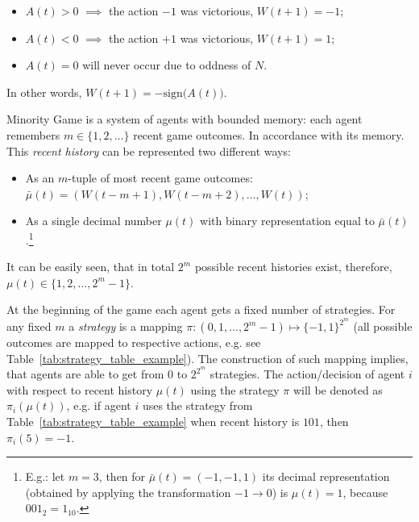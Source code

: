 \documentclass[11pt,american,czech]{article}
\begin{document}
\begin{itemize}
\item $A(t)>0$ $\implies$ the action $-1$ was victorious, $W(t+1)=-1$;
\item $A(t)<0$ $\implies$ the action $+1$ was victorious, $W(t+1)=1$;
\item $A(t)=0$ will never occur due to oddness of $N$.
\end{itemize} 

\noindent
In other words, $W(t+1) = -\text{sign}\big(A(t)\big)$.

\medskip

Minority  Game is a system of agents with bounded memory: each agent remembers $m\in\{1,2,\dots\}$ recent game outcomes. In accordance with its memory. This \textit{recent history} can be represented two different ways:

\begin{itemize}
	\item As an $m$-tuple of most recent game outcomes: $\bar{\mu}(t)=(W(t-m+1),W(t-m+2),\dots,W(t))$;
	\item As a single decimal number $\mu(t)$ with binary representation equal to $\bar{\mu}(t)$.\footnote{E.g.: let $m=3$, then for $\bar{\mu}(t)=(-1,-1,1)$ its decimal representation (obtained by applying the transformation $-1\rightarrow 0$) is $\mu(t)=1$, because $001_{2}=1_{10}$.}
\end{itemize} 

\noindent
It can be easily seen, that in total $2^{m}$ possible recent histories exist, therefore, $\mu(t)\in\{1,2,\dots,2^{m}-1\}$.

\medskip

At the beginning of the game each agent gets a fixed number of strategies. For any fixed $m$ a \textit{strategy} is a mapping $\pi:(0,1,\dots,2^m-1)\mapsto\{-1,1\}^{2^{m}}$ (all possible outcomes are mapped to respective actions, e.g. see Table~\ref{tab:strategy_table_example}). The construction of such mapping implies, that agents are able to get from $0$ to $2^{2^{m}}$ strategies. The action/decision of agent $i$ with respect to recent history $\mu(t)$ using the strategy $\pi$ will be denoted as $\pi_{i}(\mu(t))$, e.g. if agent $i$ uses the strategy from Table~\ref{tab:strategy_table_example} when recent history is $101$, then $\pi_{i}(5)= -1$.
\end{document}

